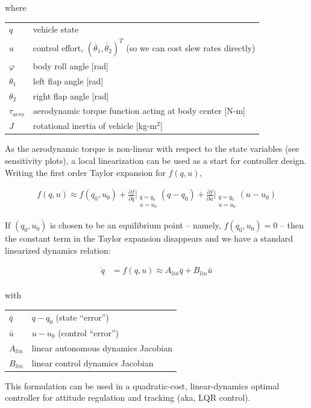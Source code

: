 \documentclass[12pt]{article}
\makeatletter
\newenvironment{conditions}
  {\par\vspace{\abovedisplayskip}\noindent\begin{tabular}{>{$}l<{$} @{${}={}$} l}}
  {\end{tabular}\par\vspace{\belowdisplayskip}}
\makeatother
\begin{document}
where

\begin{conditions}
q & vehicle state \\
u & control effort, $(\dot{\theta_1}, \dot{\theta_2})^T$ (so we can cost slew rates directly) \\
\varphi & body roll angle [rad] \\
\theta_1 & left flap angle [rad] \\
\theta_2 & right flap angle [rad] \\
\tau_{aero} & aerodynamic torque function acting at body center [N-m] \\
J & rotational inertia of vehicle [kg-m$^2$] \\
\end{conditions}

As the aerodynamic torque is non-linear with respect to the state variables (see sensitivity plots), a local linearization can be used as a start for controller design.  Writing the first order Taylor expansion for $f(q, u)$,

\begin{align*}
f(q, u) \approx f(q_0, u_0) + \frac{\partial f}{\partial q}\Big|_{\substack{q = q_0\\u = u_0}} (q-q_0) + \frac{\partial f}{\partial u}\Big|_{\substack{q = q_0\\u = u_0}} (u-u_0)
\end{align*}

If $(q_0, u_0)$ is chosen to be an equilibrium point -- namely, $f(q_0, u_0) = 0$ -- then the constant term in the Taylor expansion disappears and we have a standard linearized dynamics relation:

\begin{align*}
\dot{q} &= f(q, u) \approx A_{lin} \bar{q} + B_{lin} \bar{u} \\
\end{align*}

with

\begin{conditions}
\bar{q} & $q-q_0$ (state ``error'')\\
\bar{u} & $u-u_0$ (control ``error'')\\
A_{lin} & linear autonomous dynamics Jacobian \\
B_{lin} & linear control dynamics Jacobian \\
\end{conditions}

This formulation can be used in a quadratic-cost, linear-dynamics optimal controller for attitude regulation and tracking (aka, LQR control).
\end{document}
